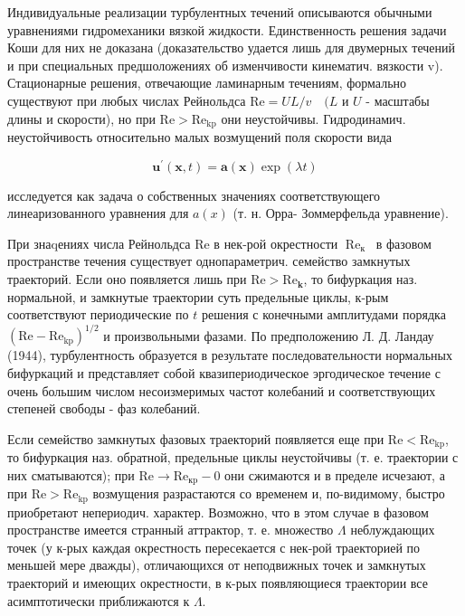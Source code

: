 \documentclass[10pt]{article}
\begin{document}
Индивидуальные реализации турбулентных течений описываются обычными уравнениями гидромеханики вязкой жидкости. Единственность решения задачи Коши для них не доказана (доказательство удается лишь для двумерных течений и при специальных предшоложениях об изменчивости кинематич. вязкости v). Стационарные решения, отвечающие ламинарным течениям, формально существуют при любых числах Рейнольдса $\mathrm{Re}=U L / v \quad(L$ и $U$ - масштабы длины и скорости), но при $\mathrm{Re}>\mathrm{Re}_{\mathrm{kp}}$ они неустойчивы. Гидродинамич. неустойчивость относительно малых возмущений поля скорости вида



\[

\boldsymbol{u}^{\prime}(\boldsymbol{x}, t)=\boldsymbol{a}(\boldsymbol{x}) \exp (\lambda t)

\]



исследуется как задача о собственных значениях соответствующего линеаризованного уравнения для $a(x)$ (т. н. Орра- Зоммерфельда уравнение).



При знаqениях числа Рейнольдса Re в нек-рой окрестности $\operatorname{Re}_{\text {к }}$ в фазовом пространстве течения существует однопараметрич. семейство замкнутых траекторий. Если оно появляется лишь при $\mathrm{Re}>\mathrm{Re}_{\mathbf{k}}$, то бифуркация наз. нормальной, и замкнутые траектории суть предельные циклы, к-рым соответствуют периодические по $t$ решения с конечными амплитудами порядка $\left(\mathrm{Re}-\mathrm{Re}_{\mathrm{kp}}\right)^{1 / 2}$ и произвольными фазами. По предположению Л. Д. Ландау (1944), турбулентность образуется в результате последовательности нормальных бифуркаций и представляет собой квазипериодическое эргодическое течение с очень большим числом несоизмеримых частот колебаний и соответствующих степеней свободы - фаз колебаний.



Если семейство замкнутых фазовых траекторий появляется еще при $\mathrm{Re}<\mathrm{Re}_{\mathrm{kp}}$, то бифуркация наз. обратной, предельные циклы неустойчивы (т. е. траектории с них сматываются); при $\mathrm{Re} \rightarrow \mathrm{Re}_{\mathrm{кp}}-0$ они сжимаются и в пределе исчезают, а при $\mathrm{Re}>\mathrm{Re}_{\mathrm{kp}}$ возмущения разрастаются со временем и, по-видимому, быстро приобретают непериодич. характер. Возможно, что в этом случае в фазовом пространстве имеется странный аттрактор, т. е. множество $\Lambda$ неблуждающих точек (у к-рых каждая окрестность пересекается с нек-рой траекторией по меньшей мере дважды), отличающихся от неподвижных точек и замкнутых траекторий и имеющих окрестности, в к-рых появляющиеся траектории все асимптотически приближаются к $\Lambda$.
\end{document}

